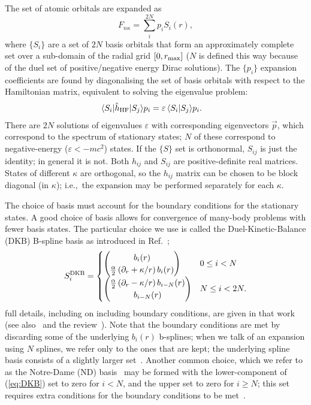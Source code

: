 \documentclass[10pt,twocolumn,a4paper]{article}%
\newcommand{\bra}[1]{\ensuremath{\langle #1|}}	%
\newcommand{\ket}[1]{\ensuremath{|#1\rangle}}	%
\newcommand{\braket}[1]{\ensuremath{\langle #1\rangle}}	%
\newcommand{\twocomp}[2]{\ensuremath{\begin{pmatrix}#1\\#2\end{pmatrix}}}	%
\newcommand{\be}{\begin{equation}}
\newcommand{\ee}{\end{equation}}
\def\en{\ensuremath{\varepsilon}}
\def\p{\ensuremath{\partial}}
\renewcommand{\k}{\ensuremath{\kappa}}
\begin{document}
The set of atomic orbitals are expanded as
\be
F_{n\k} = \sum_i^{2N} p_i S_i(r),
\ee
where $\{S_i\}$ are a set of $2N$ basis orbitals that form an approximately complete set over a sub-domain of the radial grid $[0,r_{\rm max}]$ ($N$ is defined this way because of the duel set of positive/negative energy Dirac solutions).
The $\{p_i\}$ expansion coefficients are found by diagonalising the set of basis orbitals with respect to the Hamiltonian matrix, equivalent to solving the eigenvalue problem:
\begin{align}\label{eq:Hij-splines}
\bra{S_i}\hat h_{\rm HF}\ket{S_j} p_i &= \en\,\braket{S_i|S_j} p_i.
\end{align}
There are $2N$ solutions of eigenvalues $\en$ with corresponding eigenvectors $\vec{p}$, which correspond to the spectrum of stationary states; $N$ of these correspond to negative-energy ($\en<-mc^2$) states.
If the $\{S\}$ set is orthonormal, $S_{ij}$ is just the identity; in general it is not.
Both $h_{ij}$ and $S_{ij}$ are positive-definite real matrices.
States of different $\k$ are orthogonal, so the $h_{ij}$ matrix can be chosen to be block diagonal (in $\k$); i.e.,\ the expansion may be performed separately for each $\kappa$.







The choice of basis must account for the boundary conditions for the stationary states.
A good choice of basis allows for convergence of many-body problems with fewer basis states.
The particular choice we use is called the Duel-Kinetic-Balance (DKB) B-spline basis as introduced in Ref.~\cite{Beloy2008};
\be\label{eq:DKB}
S_i^{\rm DKB}= \begin{cases}
\twocomp{b_i(r)}{\frac{\alpha}{2}\left(\p_r+\kappa/r\right)b_i(r)}  &  0\leq i<N \\
\twocomp{\frac{\alpha}{2}\left(\p_r-\kappa/r\right)b_{i-N}(r)}{b_{i-N}(r)}   & N\leq i<2N.
\end{cases}
\ee
full details, including on including boundary conditions,
are given in that work (see also~\cite{Johnson1988,AMBiT2018} and the review~\cite{Bachau2001}).
Note that the boundary conditions are met by discarding some of the underlying $b_i(r)$ b-splines; when we talk of an expansion using $N$ splines, we refer only to the ones that are kept; the underlying spline basis consists of a slightly larger set~\cite{Beloy2008}.
Another common choice, which we refer to as the Notre-Dame (ND) basis~\cite{Johnson1988} may be formed with the lower-component of (\ref{eq:DKB}) set to zero for $i<N$, and the upper set to zero for $i\geq N$; this set requires extra conditions for the boundary conditions to be met~\cite{Johnson1988}.
\end{document}
